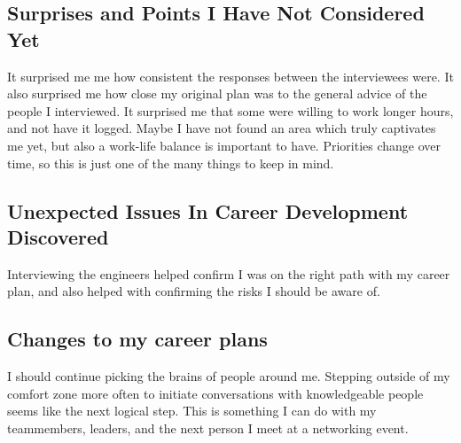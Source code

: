 \subsection{Surprises and Points I Have Not Considered Yet}
It surprised me me how consistent the responses between the interviewees were.
It also surprised me how close my original plan was to the general advice of
the people I interviewed. It surprised me that some were willing to work longer
hours, and not have it logged. Maybe I have not found an area which truly
captivates me yet, but also a work-life balance is important to have. Priorities
change over time, so this is just one of the many things to keep in mind.

\subsection{Unexpected Issues In Career Development Discovered}
Interviewing the engineers helped confirm I was on the right path with my
career plan, and also helped with confirming the risks I should be aware of.

\subsection{Changes to my career plans}
I should continue picking the brains of people around me. 
Stepping outside of my comfort zone more often to initiate conversations with knowledgeable people seems like the next logical step. This is something I can do with my teammembers, leaders, and the next person I meet at a networking event.
